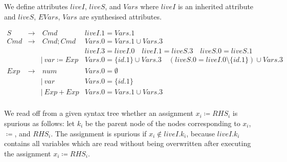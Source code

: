 \begin{solution}
We define attributes $liveI$, $liveS$, and $Vars$ where $liveI$ is an inherited attribute and $liveS$, $EVars$, $Vars$ are synthesised attributes.

  \begin{center}
	$\begin{array}{lcll}
		S &\to& ~Cmd & liveI.1 = Vars.1    \\
		Cmd &\to& ~Cmd;Cmd & Vars.0 = Vars.1 \cup Vars.3\\
		    &   &          & liveI.3 = liveI.0 \quad liveI.1 = liveS.3 \quad liveS.0 = liveS.1 \\
		&&\mid ~ var \coloneqq Exp & Vars.0 = \{id.1\} \cup Vars.3 \quad (liveS.0 = liveI.0 \setminus \{id.1\}) \cup Vars.3 \\
		Exp &\to& ~num & Vars.0 = \emptyset\\
		&&\mid ~ var & Vars.0 = \{id.1\}\\
		&&\mid ~ Exp + Exp & Vars.0 = Vars.1 \cup Vars.3\\
	\end{array}$
\end{center}
%
We read off from a given syntax tree whether an assignment $x_i \coloneqq RHS_i$ is spurious as follows: let $k_i$ be the parent node of the nodes corresponding to $x_i$, $\coloneqq$, and $RHS_i$. The assignment is spurious if $x_i \not\in liveI.k_i$, because $liveI.k_i$ contains all variables which are read without being overwritten after executing the assignment $x_i \coloneqq RHS_i$.

\end{solution}
